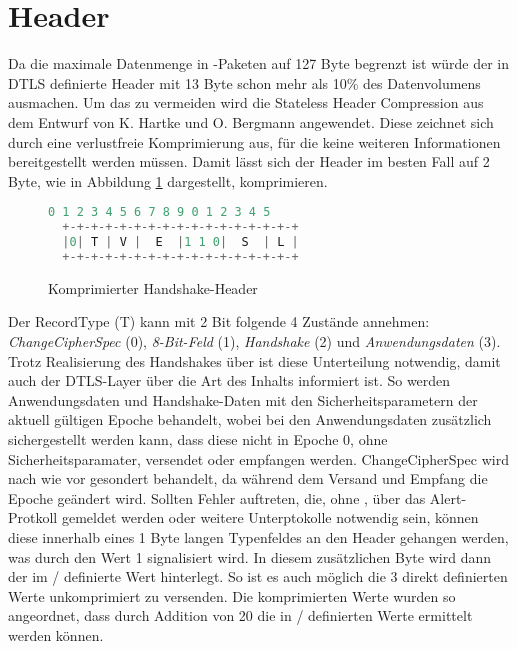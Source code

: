 \section{Header}

Da die maximale Datenmenge in -Paketen auf 127 Byte begrenzt ist würde der in DTLS definierte Header mit 13 Byte schon mehr als 10\% des
Datenvolumens ausmachen. Um das zu vermeiden wird die Stateless Header Compression aus dem Entwurf von K. Hartke und O. Bergmann \cite[Kapitel 3]{draftcodtls}
angewendet. Diese zeichnet sich durch eine verlustfreie Komprimierung aus, für die keine weiteren Informationen bereitgestellt werden müssen. Damit
lässt sich der Header im besten Fall auf 2 Byte, wie in Abbildung \ref{fig:com_handshake_header} dargestellt, komprimieren.

\begin{figure}[ht]
  \centering
  \begin{lstlisting}[language=c]
   0 1 2 3 4 5 6 7 8 9 0 1 2 3 4 5
  +-+-+-+-+-+-+-+-+-+-+-+-+-+-+-+-+
  |0| T | V |  E  |1 1 0|  S  | L |
  +-+-+-+-+-+-+-+-+-+-+-+-+-+-+-+-+
  \end{lstlisting}
  \caption{Komprimierter Handshake-Header}
  \label{fig:com_handshake_header}
\end{figure}

Der RecordType (T) kann mit 2 Bit folgende 4 Zustände annehmen: \textit{ChangeCipherSpec} (0), \textit{8-Bit-Feld} (1), \textit{Handshake} (2) und
\textit{Anwendungsdaten} (3). Trotz Realisierung des Handshakes über  ist diese Unterteilung notwendig, damit auch der DTLS-Layer über die
Art des Inhalts informiert ist. So werden Anwendungsdaten und Handshake-Daten mit den Sicherheitsparametern der aktuell gültigen Epoche behandelt,
wobei bei den Anwendungsdaten zusätzlich sichergestellt werden kann, dass diese nicht in Epoche 0, ohne Sicherheitsparamater, versendet oder empfangen
werden. ChangeCipherSpec wird nach wie vor gesondert behandelt, da während dem Versand und Empfang die Epoche geändert wird. Sollten Fehler auftreten,
die, ohne , über das Alert-Protkoll gemeldet werden oder weitere Unterptokolle notwendig sein, können diese innerhalb eines 1 Byte langen Typenfeldes an
den Header gehangen werden, was durch den Wert 1 signalisiert wird. In diesem zusätzlichen Byte wird dann der im / definierte
Wert hinterlegt. So ist es auch möglich die 3 direkt definierten Werte unkomprimiert zu versenden. Die komprimierten Werte wurden so angeordnet,
dass durch Addition von 20 die in / definierten Werte ermittelt werden können.

